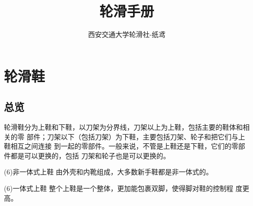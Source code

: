 \documentclass[12pt]{ctexart}
\title{轮滑手册}
\author{西安交通大学轮滑社-纸鸢}
\begin{document}
\thispagestyle{empty}
\maketitle
\clearpage
\tableofcontents
\clearpage
\section{轮滑鞋}
\subsection{总览}
轮滑鞋分为上鞋和下鞋，以刀架为分界线，刀架以上为上鞋，包括主要的鞋体和相关的零
部件；刀架以下（包括刀架）为下鞋，主要包括刀架、轮子和把它们与上鞋相互之间连接
到一起的零部件。一般来说，不管是上鞋还是下鞋，它们的零部件都是可以更换的，包括
刀架和轮子也是可以更换的。

\bsctype(6){非一体式上鞋} 由外壳和内靴组成，大多数新手鞋都是非一体式的。

\bsctype(6){一体式上鞋} 整个上鞋是一个整体，更加能包裹双脚，使得脚对鞋的控制程
度更高。
\end{document}
